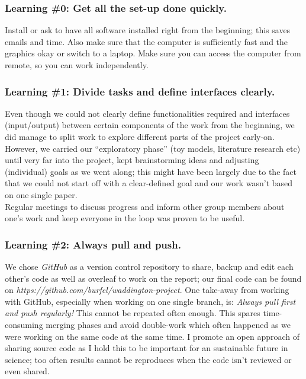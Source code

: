 \documentclass[journal, a4paper]{IEEEtran}
\begin{document}

\hfill
\subsubsection{Learning \#0: Get all the set-up done quickly.}

Install or ask to have all software installed right from the beginning; this saves emails and time. Also make sure that the computer is sufficiently fast and the graphics okay or switch to a laptop. Make sure you can access the computer from remote, so you can work independently.

\hfill
\subsubsection{Learning \#1: Divide tasks and define interfaces clearly.}
Even though we could not clearly define functionalities required and interfaces (input/output) between certain components of the work from the beginning, we did manage to split work to explore different parts of the project early-on. However, we carried our “exploratory phase” (toy models, literature research etc) until very far into the project, kept brainstorming ideas and adjusting (individual) goals as we went along; this might have been largely due to the fact that we could not start off with a clear-defined goal and our work wasn’t based on one single paper. \\
Regular meetings to discuss progress and inform other group members about one’s work and keep everyone in the loop was proven to be useful. 

\hfill
\subsubsection{Learning \#2: Always pull and push.}
We chose \textit{GitHub} as a version control repository to share, backup and edit each other’s code as well as overleaf to work on the report; our final code can be found on \textit{https://github.com/burfel/waddington-project}. One take-away from working with GitHub, especially when working on one single branch, is: \textit{Always pull first and push regularly!} This cannot be repeated often enough. This spares time-consuming merging phases and avoid double-work which often happened as we were working on the same code at the same time. 
I promote an open approach of sharing source code as I hold this to be important for an sustainable future in science; too often results cannot be reproduces when the code isn’t reviewed or even shared.
\end{document}
